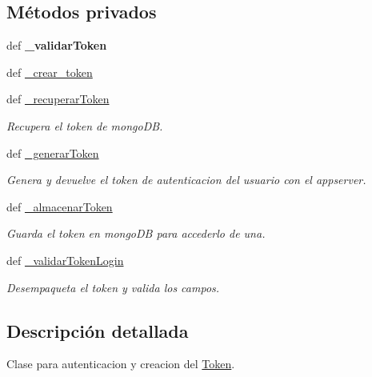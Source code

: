 \subsection*{Métodos privados}
\begin{DoxyCompactItemize}
\item 
\hypertarget{classsrc_1_1models_1_1token_1_1_token_a3ecc3ba1983a70ec195612df45d4ad3f}{def {\bfseries \-\_\-validar\-Token}}\label{classsrc_1_1models_1_1token_1_1_token_a3ecc3ba1983a70ec195612df45d4ad3f}

\item 
def \hyperlink{classsrc_1_1models_1_1token_1_1_token_a6dae16035576f9945a55ff47f09a56e7}{\-\_\-crear\-\_\-token}
\item 
def \hyperlink{classsrc_1_1models_1_1token_1_1_token_a2bd63e97694f42d32303c6d563d8c65e}{\-\_\-recuperar\-Token}
\begin{DoxyCompactList}\small\item\em Recupera el token de mongo\-D\-B. \end{DoxyCompactList}\item 
def \hyperlink{classsrc_1_1models_1_1token_1_1_token_a90daa7df2e19d41481bb3570a77de2f7}{\-\_\-generar\-Token}
\begin{DoxyCompactList}\small\item\em Genera y devuelve el token de autenticacion del usuario con el appserver. \end{DoxyCompactList}\item 
def \hyperlink{classsrc_1_1models_1_1token_1_1_token_a90eaf9eddea9e6f6b04c7a4b8542b71f}{\-\_\-almacenar\-Token}
\begin{DoxyCompactList}\small\item\em Guarda el token en mongo\-D\-B para accederlo de una. \end{DoxyCompactList}\item 
def \hyperlink{classsrc_1_1models_1_1token_1_1_token_a4f267817c4ea319c779cbbd77783c08d}{\-\_\-validar\-Token\-Login}
\begin{DoxyCompactList}\small\item\em Desempaqueta el token y valida los campos. \end{DoxyCompactList}\end{DoxyCompactItemize}


\subsection{Descripción detallada}
Clase para autenticacion y creacion del \hyperlink{classsrc_1_1models_1_1token_1_1_token}{Token}. 



